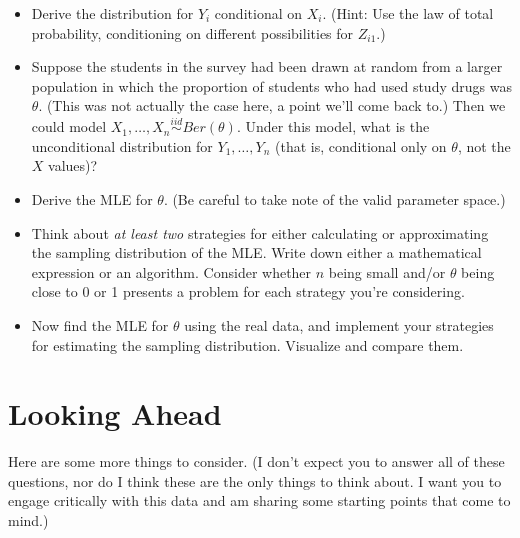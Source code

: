 \documentclass[11pt, oneside]{article}   	%
\begin{document}
\begin{itemize}
\item Derive the distribution for $Y_i$ conditional on $X_i$. (Hint: Use the law of total probability, conditioning on different possibilities for $Z_{i1}$.)
\item Suppose the students in the survey had been drawn at random from a larger population in which the proportion of students who had used study drugs was $\theta$. (This was not actually the case here, a point we'll come back to.) Then we could model $X_1, \ldots, X_n \stackrel{iid}{\sim} Ber(\theta)$. Under this model, what is the unconditional distribution for $Y_1, \ldots, Y_n$ (that is, conditional only on $\theta$, not the $X$ values)?
\item Derive the MLE for $\theta$. (Be careful to take note of the valid parameter space.)
\item Think about {\em at least two} strategies for either calculating or approximating the sampling distribution of the MLE. Write down either a mathematical expression or an algorithm. Consider whether $n$ being small and/or $\theta$ being close to 0 or 1 presents a problem for each strategy you're considering.
\item Now find the MLE for $\theta$ using the real data, and implement your strategies for estimating the sampling distribution. Visualize and compare them.
\end{itemize}

\section{Looking Ahead}

Here are some more things to consider. (I don't expect you to answer all of these questions, nor do I think these are the only things to think about. I want you to engage critically with this data and am sharing some starting points that come to mind.)
\end{document}
